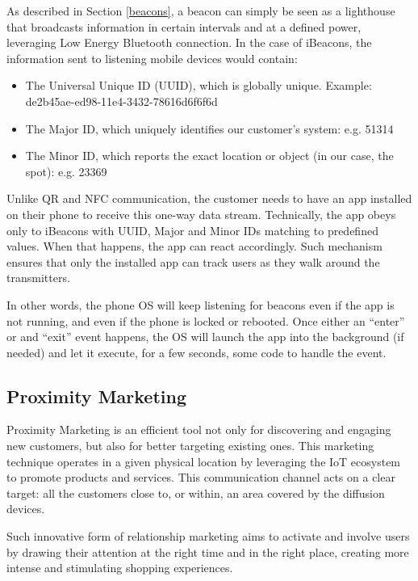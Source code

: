 As described in Section \ref{beacons}, a beacon can simply be seen as a lighthouse that broadcasts information in certain intervals and at a defined power, leveraging Low Energy Bluetooth connection. In the case of iBeacons, the information sent to listening mobile devices would contain:


\begin{itemize}
  \item The Universal Unique ID (UUID), which is globally unique. Example: de2b45ae-ed98-11e4-3432-78616d6f6f6d
  \item The Major ID, which uniquely identifies our customer’s system: e.g. 51314
  \item The Minor ID, which reports the exact location or object (in our case, the spot): e.g. 23369
\end{itemize}

Unlike QR and NFC communication, the customer needs to have an app installed on their phone to receive this one-way data stream. Technically, the app obeys only to iBeacons with UUID, Major and Minor IDs matching to predefined values. When that happens, the app can react accordingly. Such mechanism ensures that only the installed app can track users as they walk around the transmitters. 

In other words, the phone OS will keep listening for beacons even if the app is not running, and even if the phone is locked or rebooted. Once either an “enter” or and “exit” event happens, the OS will launch the app into the background (if needed) and let it execute, for a few seconds, some code to handle the event.

\subsection{Proximity Marketing}
\label{section:proximity-marketing}

Proximity Marketing is an efficient tool not only for discovering and engaging new customers, but also for better targeting existing ones. This marketing technique operates in a given physical location by leveraging the IoT ecosystem to promote products and services.  This communication channel acts on a clear target: all the customers close to, or within, an area covered by the diffusion devices.

Such innovative form of relationship marketing aims to activate and involve users by drawing their attention at the right time and in the right place, creating more intense and stimulating shopping experiences.

